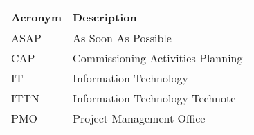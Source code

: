 \addtocounter{table}{-1}
\begin{longtable}{p{}p{}}\hline
\textbf{Acronym} & \textbf{Description}  \\\hline

ASAP & As Soon As Possible \\\hline
CAP & Commissioning Activities Planning \\\hline
IT & Information Technology \\\hline
ITTN & Information Technology Technote \\\hline
PMO & Project Management Office \\\hline
\end{longtable}

